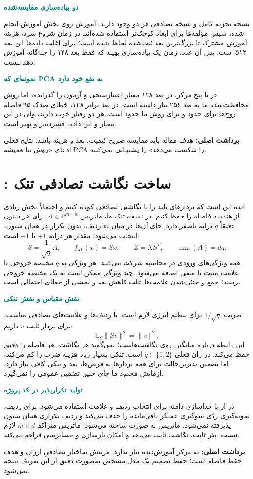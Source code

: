 \documentclass[11pt,a4paper]{article}
\newcommand{\lesson}[1]{\clearpage\section{#1}}
\newcommand{\key}[1]{\par\vspace{4pt}\noindent\colorbox{pale}{\parbox{\dimexpr\textwidth-2\fboxsep\relax}{\textbf{برداشت اصلی:} #1}}\par\vspace{3pt}}
\newcommand{\sub}[1]{\par\vspace{3pt}\textbf{\textcolor{teal}{#1}}\par}
\begin{document}
\sub{دو پیاده‌سازی مقایسه‌شده}
نسخه تجزیه کامل  و نسخه تصادفی  هر دو وجود دارند. آموزش روی بخش آموزش انجام شده، سپس مؤلفه‌ها برای ابعاد کوچک‌تر استفاده شده‌اند. در زمان شروع سرد، هزینه آموزش مشترک تا بزرگ‌ترین بعد ثبت‌شده لحاظ شده است؛ برای اغلب داده‌ها این بعد ۵۱۲ است. پس آن عدد، زمان یک پیاده‌سازی بهینه که فقط بعد ۱۲۸ را جداگانه آموزش دهد نیست.

\sub{نمونه‌ای که PCA به نفع خود دارد}
در  با پنج مرکز،  در بعد ۱۲۸ معیار اعتبارسنجی و آزمون را گذرانده، اما روش محافظت‌شده ما به بعد ۲۵۶ نیاز داشته است. در بعد برابر ۱۲۸، خطای صدک ۹۵ فاصله زوج‌ها برای  حدود  و برای روش ما حدود  است. هر دو رفتار خوب دارند، ولی در این معیار و این داده،  فشرده‌تر و بهتر است.
\key{هدف مقاله باید مقایسه صریح کیفیت، بعد و هزینه باشد. نتایج فعلی ادعای «روش ما همیشه PCA را شکست می‌دهد» را پشتیبانی نمی‌کنند.}

\lesson{: ساخت نگاشت تصادفی تنک}
ایده  این است که بردارهای بلند را با نگاشتی تصادفی کوتاه کنیم و احتمالاً بخش زیادی از هندسه فاصله را حفظ کنیم. در نسخه تنک ما، ماتریس \(A\in\mathbb{R}^{m\times d}\) برای هر ستون دقیقاً \(q\) درایه ناصفر دارد. جای آن‌ها در میان \(m\) ردیف، بدون تکرار در همان ستون، انتخاب می‌شود؛ مقدار هر درایه \(+1\) یا \(-1\) است.
\[
 S=\frac{1}{\sqrt q}A,\qquad
 f_{JL}(x)=Sx,\qquad Z=XS^T,\qquad \operatorname{nnz}(A)=dq.
\]
همه ویژگی‌های ورودی در محاسبه شرکت می‌کنند. هر ویژگی به \(q\) مختصه خروجی با علامت مثبت یا منفی اضافه می‌شود. چند ویژگی ممکن است به یک مختصه خروجی برسند؛ جمع و خنثی‌شدن علامت‌ها علت کاهش بعد و بخشی از خطای احتمالی است.

\sub{نقش مقیاس و نقش تنکی}
ضریب \(1/\sqrt q\) برای تنظیم انرژی لازم است. با ردیف‌ها و علامت‌های تصادفی مناسب، برای بردار ثابت \(v\) داریم:
\[
 \mathbb{E}_S\|Sv\|^2=\|v\|^2.
\]
این رابطه درباره میانگین روی نگاشت‌هاست؛ نمی‌گوید هر نگاشت، هر فاصله را دقیق حفظ می‌کند. در ران فعلی \(q\in\{1,2\}\) است. تنکی بسیار زیاد هزینه ضرب را کم می‌کند، اما تضمین بدترین‌حالت برای همه بردارها به فرض‌ها، بعد و تنکی کافی نیاز دارد. آزمایش محدود ما جای چنین تضمین عمومی را نمی‌گیرد.

\sub{تولید تکرارپذیر در کد پروژه}
در  از  با جداسازی دامنه برای انتخاب ردیف و علامت استفاده می‌شود. برای ردیف، نمونه‌گیری ردّی سوگیری عملگر باقی‌مانده را حذف می‌کند و ردیف تکراری همان ستون پذیرفته نمی‌شود. ماتریس به صورت  ساخته می‌شود؛ ماتریس متراکم \(m\times d\) لازم نیست. بذر ثابت، نگاشت ثابت می‌دهد و امکان بازسازی و حسابرسی فراهم می‌کند.
\key{ به مرکز آموزش‌دیده نیاز ندارد. مزیتش ساختار تصادفیِ ارزان و هدف حفظ فاصله است؛ حفظ تصمیم یک مدل مشخص به‌صورت دقیق از این تعریف نتیجه نمی‌شود.}
\end{document}
